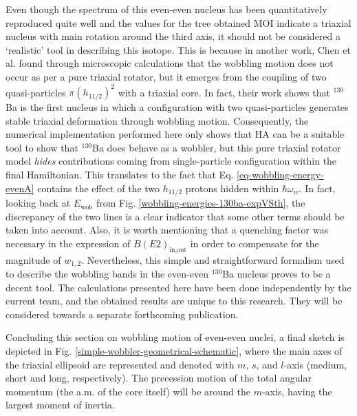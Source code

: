 Even though the spectrum of this even-even nucleus has been quantitatively reproduced quite well and the values for the tree obtained MOI indicate a triaxial nucleus with main rotation around the third axis, it should not be considered a `realistic' tool in describing this isotope. This is because in another work, Chen et al. \cite{chen2019transverse} found through microscopic calculations that the wobbling motion does not occur as per a pure triaxial rotator, but it emerges from the coupling of two quasi-particles $\pi(h_{11/2})^2$ with a triaxial core. In fact, their work shows that $^{130}$Ba is the first nucleus in which a configuration with two quasi-particles generates stable triaxial deformation through wobbling motion. Consequently, the numerical implementation performed here only shows that HA can be a suitable tool to show that $^{130}$Ba does behave as a wobbler, but this pure triaxial rotator model \emph{hides} contributions coming from single-particle configuration within the final Hamiltonian. This translates to the fact that Eq. \ref{eq-wobbling-energy-evenA} contains the effect of the two $h_{11/2}$ protons hidden within $\hbar\omega_w$. In fact, looking back at $E_\text{wob}$ from Fig. \ref{wobbling-energies-130ba-expVSth}, the discrepancy of the two lines is a clear indicator that some other terms should be taken into account. Also, it is worth mentioning that a quenching factor was necessary in the expression of $B(E2)_\text{in,out}$ in order to compensate for the magnitude of $w_{1,2}$. Nevertheless, this simple and straightforward formalism used to describe the wobbling bands in the even-even $^{130}$Ba nucleus proves to be a decent tool. The calculations presented here have been done independently by the current team, and the obtained results are unique to this research. They will be considered towards a separate forthcoming publication.

Concluding this section on wobbling motion of even-even nuclei, a final sketch is depicted in Fig. \ref{simple-wobbler-geometrical-schematic}, where the main axes of the triaxial ellipsoid are represented and denoted with $m$, $s$, and $l$-axis (medium, short and long, respectively). The precession motion of the total angular momentum (the a.m. of the core itself) will be around the $m$-axis, having the largest moment of inertia.

